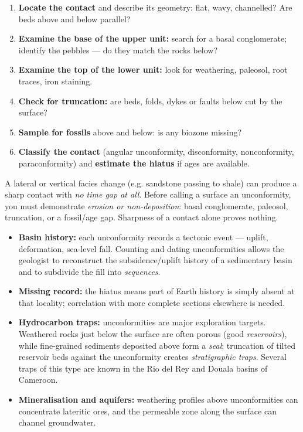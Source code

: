 \documentclass[11pt]{article}
\newcommand{\cle}[1]{{\popxbold\color{popdark}#1}}
\newcounter{popsec}
\newcounter{popsub}
\newcommand{\courssub}[1]{%
  \stepcounter{popsub}%
  \par\vspace{9pt}\noindent{\popxbold\fontsize{11.5}{13}\selectfont\color{popink}{\color{poporange}\thepopsec.\thepopsub}\hspace{6pt}#1}\par\nopagebreak\vspace{4pt}
}
\begin{document}
\begin{methode}
\begin{enumerate}
\item \textbf{Locate the contact} and describe its geometry: flat, wavy, channelled? Are beds above and below parallel?
\item \textbf{Examine the base of the upper unit:} search for a basal conglomerate; identify the pebbles --- do they match the rocks below?
\item \textbf{Examine the top of the lower unit:} look for weathering, paleosol, root traces, iron staining.
\item \textbf{Check for truncation:} are beds, folds, dykes or faults below cut by the surface?
\item \textbf{Sample for fossils} above and below: is any biozone missing?
\item \textbf{Classify the contact} (angular unconformity, disconformity, nonconformity, paraconformity) and \textbf{estimate the hiatus} if ages are available.
\end{enumerate}
\end{methode}

\begin{attention}
A lateral or vertical \cle{facies change} (e.g. sandstone passing to shale) can produce a sharp contact with \emph{no time gap at all}. Before calling a surface an unconformity, you must demonstrate \emph{erosion or non-deposition}: basal conglomerate, paleosol, truncation, or a fossil/age gap. Sharpness of a contact alone proves nothing.
\end{attention}

\courssub{Significance of Unconformities}

\begin{itemize}
\item \textbf{Basin history:} each unconformity records a tectonic event --- uplift, deformation, sea-level fall. Counting and dating unconformities allows the geologist to reconstruct the subsidence/uplift history of a sedimentary basin and to subdivide the fill into \emph{sequences}.
\item \textbf{Missing record:} the hiatus means part of Earth history is simply absent at that locality; correlation with more complete sections elsewhere is needed.
\item \textbf{Hydrocarbon traps:} unconformities are major exploration targets. Weathered rocks just below the surface are often porous (good \emph{reservoirs}), while fine-grained sediments deposited above form a \emph{seal}; truncation of tilted reservoir beds against the unconformity creates \emph{stratigraphic traps}. Several traps of this type are known in the Rio del Rey and Douala basins of Cameroon.
\item \textbf{Mineralisation and aquifers:} weathering profiles above unconformities can concentrate lateritic ores, and the permeable zone along the surface can channel groundwater.
\end{itemize}
\end{document}
